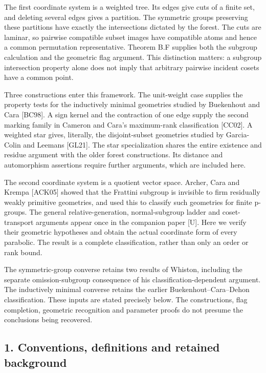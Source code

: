 \documentclass[
  11pt,
  a4paper,
]{article}
\begin{document}
The first coordinate system is a weighted tree. Its edges give cuts of a
finite set, and deleting several edges gives a partition. The symmetric
groups preserving these partitions have exactly the intersections
dictated by the forest. The cuts are laminar, so pairwise compatible
subset images have compatible atoms and hence a common permutation
representative. Theorem B.F supplies both the subgroup calculation and
the geometric flag argument. This distinction matters: a subgroup
intersection property alone does not imply that arbitrary pairwise
incident cosets have a common point.

Three constructions enter this framework. The unit-weight case supplies
the property tests for the inductively minimal geometries studied by
Buekenhout and Cara {[}BC98{]}. A sign kernel and the contraction of one
edge supply the second marking family in Cameron and Cara's maximum-rank
classification {[}CC02{]}. A weighted star gives, literally, the
disjoint-subset geometries studied by Garcia-Colin and Leemans
{[}GL21{]}. The star specialization shares the entire existence and
residue argument with the older forest constructions. Its distance and
automorphism assertions require further arguments, which are included
here.

The second coordinate system is a quotient vector space. Archer, Cara
and Krempa {[}ACK05{]} showed that the Frattini subgroup is invisible to
firm residually weakly primitive geometries, and used this to classify
such geometries for finite p-groups. The general relative-generation,
normal-subgroup ladder and coset-transport arguments appear once in the
companion paper {[}U{]}. Here we verify their geometric hypotheses and
obtain the actual coordinate form of every parabolic. The result is a
complete classification, rather than only an order or rank bound.

The symmetric-group converse retains two results of Whiston, including
the separate omission-subgroup consequence of his
classification-dependent argument. The inductively minimal converse
retains the earlier Buekenhout--Cara--Dehon classification. These inputs
are stated precisely below. The constructions, flag completion,
geometric recognition and parameter proofs do not presume the
conclusions being recovered.

\subsection{1. Conventions, definitions and retained
background}\label{conventions-definitions-and-retained-background}
\end{document}
